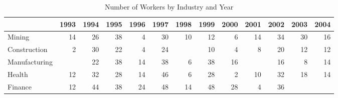 \documentclass{article}
\begin{document}
\begin{table}[htbp] 
\centering 
\begin{threeparttable} 
\caption{Number of Workers by Industry and Year} 

\centering
\begin{tabular}{lllllllllllll}
\toprule
\multicolumn{1}{c}{} &
  \multicolumn{1}{r}{1993} &
  \multicolumn{1}{r}{1994} &
  \multicolumn{1}{r}{1995} &
  \multicolumn{1}{r}{1996} &
  \multicolumn{1}{r}{1997} &
  \multicolumn{1}{r}{1998} &
  \multicolumn{1}{r}{1999} &
  \multicolumn{1}{r}{2000} &
  \multicolumn{1}{r}{2001} &
  \multicolumn{1}{r}{2002} &
  \multicolumn{1}{r}{2003} &
  \multicolumn{1}{r}{2004} \\
\midrule
\multicolumn{1}{l}{Mining} &
  \multicolumn{1}{r}{14} &
  \multicolumn{1}{r}{26} &
  \multicolumn{1}{r}{38} &
  \multicolumn{1}{r}{4} &
  \multicolumn{1}{r}{30} &
  \multicolumn{1}{r}{10} &
  \multicolumn{1}{r}{12} &
  \multicolumn{1}{r}{6} &
  \multicolumn{1}{r}{14} &
  \multicolumn{1}{r}{34} &
  \multicolumn{1}{r}{30} &
  \multicolumn{1}{r}{16} \\
\multicolumn{1}{l}{Construction} &
  \multicolumn{1}{r}{2} &
  \multicolumn{1}{r}{30} &
  \multicolumn{1}{r}{22} &
  \multicolumn{1}{r}{4} &
  \multicolumn{1}{r}{24} &
  \multicolumn{1}{r}{} &
  \multicolumn{1}{r}{10} &
  \multicolumn{1}{r}{4} &
  \multicolumn{1}{r}{8} &
  \multicolumn{1}{r}{20} &
  \multicolumn{1}{r}{12} &
  \multicolumn{1}{r}{12} \\
\multicolumn{1}{l}{Manufacturing} &
  \multicolumn{1}{r}{} &
  \multicolumn{1}{r}{22} &
  \multicolumn{1}{r}{38} &
  \multicolumn{1}{r}{14} &
  \multicolumn{1}{r}{38} &
  \multicolumn{1}{r}{6} &
  \multicolumn{1}{r}{38} &
  \multicolumn{1}{r}{16} &
  \multicolumn{1}{r}{} &
  \multicolumn{1}{r}{16} &
  \multicolumn{1}{r}{8} &
  \multicolumn{1}{r}{14} \\
\multicolumn{1}{l}{Health} &
  \multicolumn{1}{r}{12} &
  \multicolumn{1}{r}{32} &
  \multicolumn{1}{r}{28} &
  \multicolumn{1}{r}{14} &
  \multicolumn{1}{r}{46} &
  \multicolumn{1}{r}{6} &
  \multicolumn{1}{r}{28} &
  \multicolumn{1}{r}{2} &
  \multicolumn{1}{r}{10} &
  \multicolumn{1}{r}{32} &
  \multicolumn{1}{r}{18} &
  \multicolumn{1}{r}{14} \\
\multicolumn{1}{l}{Finance} &
  \multicolumn{1}{r}{12} &
  \multicolumn{1}{r}{44} &
  \multicolumn{1}{r}{38} &
  \multicolumn{1}{r}{24} &
  \multicolumn{1}{r}{48} &
  \multicolumn{1}{r}{14} &
  \multicolumn{1}{r}{48} &
  \multicolumn{1}{r}{28} &
  \multicolumn{1}{r}{4} &
  \multicolumn{1}{r}{36} &

\end{tabular}
\end{threeparttable}
\end{table}
\end{document}
